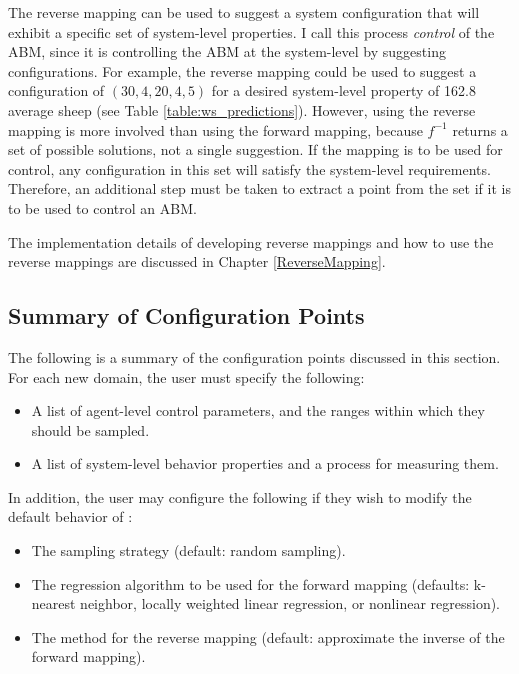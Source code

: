The reverse mapping can be used to suggest a system configuration that will exhibit a specific set of system-level properties.
I call this process \textit{control} of the ABM, since it is controlling the ABM at the system-level by suggesting configurations.
For example, the reverse mapping could be used to suggest a configuration of $(30, 4, 20, 4, 5)$  for a desired system-level property of 162.8 average sheep (see Table \ref{table:ws_predictions}).
However, using the reverse mapping is more involved than using the forward mapping, because $f^{-1}$ returns a set of possible solutions, not a single suggestion.
If the mapping is to be used for control, any configuration in this set will satisfy the system-level requirements.
Therefore, an additional step must be taken to extract a point from the set if it is to be used to control an ABM.

The implementation details of developing reverse mappings and how to use the reverse mappings are discussed in Chapter \ref{ReverseMapping}.






\subsection{Summary of Configuration Points}

The following is a summary of the configuration points discussed in this section.
For each new domain, the user must specify the following:
\begin{itemize}
   \item A list of agent-level control parameters, and the ranges within which they should be sampled.
   \item A list of system-level behavior properties and a process for measuring them.
\end{itemize}

In addition, the user may configure the following if they wish to modify the default behavior of \fw:
\begin{itemize}
   \item The sampling strategy (default: random sampling).
   \item The regression algorithm to be used for the forward mapping (defaults: k-nearest neighbor, locally weighted linear regression, or nonlinear regression).
   \item The method for the reverse mapping (default: approximate the inverse of the forward mapping).
\end{itemize}


